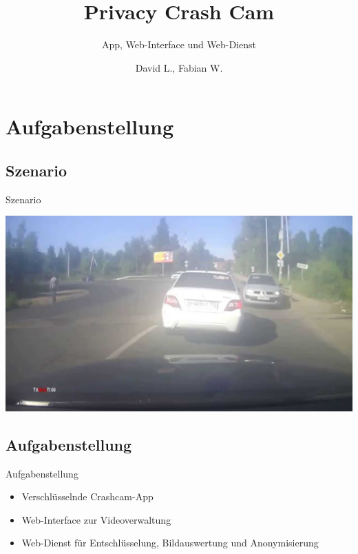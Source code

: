\documentclass[19pt]{beamer}
\title[PCC]{Privacy Crash Cam}
\subtitle{App, Web-Interface und Web-Dienst}
\author{David L., Fabian W.}
\institute{Fraunhofer Institut f\"ur Optronik, Systemtechnik und Bildauswertung, (KIT)}
\begin{document}

\begin{frame}
	\titlepage
\end{frame}

\section{Aufgabenstellung}
\subsection{Szenario}
\begin{frame}{Szenario}
	\begin{center}
		\includegraphics[scale=0.25]{logos/UnfallSzenario2} 
	\end{center}
\end{frame}

\subsection{Aufgabenstellung}
\begin{frame}{Aufgabenstellung}
	\begin{itemize}
		\item Verschl\"usselnde Crashcam-App
		\item Web-Interface zur Videoverwaltung
		\item Web-Dienst f\"ur Entschl\"usselung, Bildauswertung und Anonymisierung
	\end{itemize}
\end{frame}
\end{document}
